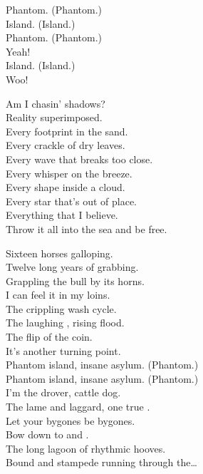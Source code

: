
Phantom. (Phantom.) \\
Island. (Island.) \\
Phantom. (Phantom.) \\
Yeah! \\
Island. (Island.) \\
Woo! \\


Am I chasin' shadows? \\
Reality superimposed. \\
Every footprint in the sand. \\
Every crackle of dry leaves. \\
Every wave that breaks too close. \\
Every whisper on the breeze. \\
Every shape inside a cloud. \\
Every star that's out of place. \\
Everything that I believe. \\
Throw it all into the sea and be free. \\


Sixteen horses galloping. \\
Twelve long years of grabbing. \\
Grappling the bull by its horns. \\
I can feel it in my loins. \\
The crippling  wash cycle. \\
The laughing , rising flood. \\
The flip of the coin. \\
It's another turning point. \\

Phantom island, insane asylum. (Phantom.) \\
Phantom island, insane asylum. (Phantom.) \\
I'm the drover, cattle dog. \\
The lame and laggard, one true . \\

Let your bygones be bygones. \\
Bow down to  and . \\
The long lagoon of rhythmic hooves. \\
Bound and stampede running through the… \\

